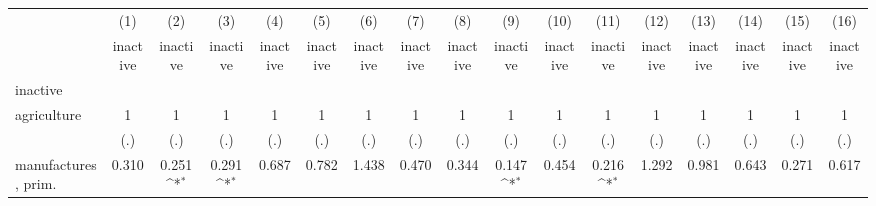 {
\def\sym#1{\ifmmode^{#1}\else\(^{#1}\)\fi}
\begin{tabular}{l*{16}{c}}
\hline\hline
                    &\multicolumn{1}{c}{(1)}&\multicolumn{1}{c}{(2)}&\multicolumn{1}{c}{(3)}&\multicolumn{1}{c}{(4)}&\multicolumn{1}{c}{(5)}&\multicolumn{1}{c}{(6)}&\multicolumn{1}{c}{(7)}&\multicolumn{1}{c}{(8)}&\multicolumn{1}{c}{(9)}&\multicolumn{1}{c}{(10)}&\multicolumn{1}{c}{(11)}&\multicolumn{1}{c}{(12)}&\multicolumn{1}{c}{(13)}&\multicolumn{1}{c}{(14)}&\multicolumn{1}{c}{(15)}&\multicolumn{1}{c}{(16)}\\
                    &\multicolumn{1}{c}{inactive}&\multicolumn{1}{c}{inactive}&\multicolumn{1}{c}{inactive}&\multicolumn{1}{c}{inactive}&\multicolumn{1}{c}{inactive}&\multicolumn{1}{c}{inactive}&\multicolumn{1}{c}{inactive}&\multicolumn{1}{c}{inactive}&\multicolumn{1}{c}{inactive}&\multicolumn{1}{c}{inactive}&\multicolumn{1}{c}{inactive}&\multicolumn{1}{c}{inactive}&\multicolumn{1}{c}{inactive}&\multicolumn{1}{c}{inactive}&\multicolumn{1}{c}{inactive}&\multicolumn{1}{c}{inactive}\\
\hline
inactive            &                     &                     &                     &                     &                     &                     &                     &                     &                     &                     &                     &                     &                     &                     &                     &                     \\
agriculture         &           1         &           1         &           1         &           1         &           1         &           1         &           1         &           1         &           1         &           1         &           1         &           1         &           1         &           1         &           1         &           1         \\
                    &         (.)         &         (.)         &         (.)         &         (.)         &         (.)         &         (.)         &         (.)         &         (.)         &         (.)         &         (.)         &         (.)         &         (.)         &         (.)         &         (.)         &         (.)         &         (.)         \\
[1em]
manufactures, prim. &       0.310         &       0.251\sym{*}  &       0.291\sym{*}  &       0.687         &       0.782         &       1.438         &       0.470         &       0.344         &       0.147\sym{*}  &       0.454         &       0.216\sym{*}  &       1.292         &       0.981         &       0.643         &       0.271         &       0.617         \\

\end{tabular}}
